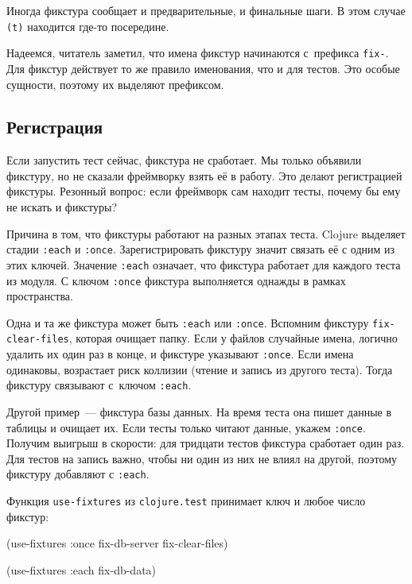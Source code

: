 Иногда фикстура сообщает и предварительные, и финальные шаги. В этом случае
\verb|(t)| находится где-то посередине.

Надеемся, читатель заметил, что имена фикстур начинаются с~префикса
\verb|fix-|. Для фикстур действует то же правило именования, что и для
тестов. Это особые сущности, поэтому их выделяют префиксом.

\subsection{Регистрация}


Если запустить тест сейчас, фикстура не сработает. Мы только объявили фикстуру,
но не сказали фреймворку взять её в работу. Это делают регистрацией фикстуры.
Резонный вопрос: если фреймворк сам находит тесты, почему бы ему не искать и
фикстуры?

Причина в том, что фикстуры работают на разных этапах теста. Clojure выделяет
стадии \verb|:each| и \verb|:once|. Зарегистрировать фикстуру значит связать
её с одним из этих ключей. Значение \verb|:each| означает, что фикстура
работает для каждого теста из модуля. С ключом \verb|:once| фикстура
выполняется однажды в рамках пространства.


Одна и та же фикстура может быть \verb|:each| или \verb|:once|. Вспомним
фикстуру \verb|fix-clear-files|, которая очищает папку. Если у файлов случайные
имена, логично удалить их один раз в конце, и фикстуре указывают
\verb|:once|. Если имена одинаковы, возрастает риск коллизии (чтение и запись из
другого теста). Тогда фикстуру связывают с~ключом \verb|:each|.

Другой пример~--- фикстура базы данных. На время теста она пишет данные в
таблицы и очищает их. Если тесты только читают данные, укажем
\verb|:once|. Получим выигрыш в скорости: для тридцати тестов фикстура
сработает один раз. Для тестов на запись важно, чтобы ни один из них не влиял на
другой, поэтому фикстуру добавляют с \verb|:each|.

Функция \verb|use-fixtures| из \verb|clojure.test| принимает ключ и любое
число фикстур:


\begin{english}
  \begin{clojure}
(use-fixtures :once
  fix-db-server fix-clear-files)

(use-fixtures :each fix-db-data)
  \end{clojure}
\end{english}

